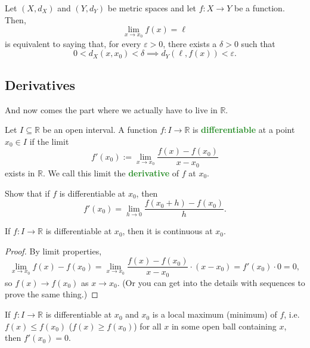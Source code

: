 \documentclass[10pt]{scrartcl}
\providecommand{\eps}{\varepsilon}
\providecommand{\RR}{\mathbb R}
\providecommand{\vocab}[1]{{\textbf{\textcolor{ForestGreen}{#1}}}}
\begin{document}
\begin{definition}\label{wk11:def:func-limit-epsdel}
	Let $(X, d_X)$ and $(Y, d_Y)$ be metric spaces
	and let $f\colon X\to Y$ be a function. Then,
	\[\lim_{x\to x_0} f(x) = \ell\]
	is equivalent to saying that, for every $\eps > 0$,
	there exists a $\delta > 0$ such that
	\[0 < d_X(x, x_0) < \delta \implies d_Y(\ell, f(x)) < \eps.\]
\end{definition}

\subsection{Derivatives}
And now comes the part where we actually have to live in $\RR$.
\begin{definition}[Differentiability]\label{wk11:def:diffable}
	Let $I\subseteq\RR$ be an open interval.
	A function $f\colon I\to\RR$ is \vocab{differentiable}
	at a point $x_0\in I$ if the limit
	\[f'(x_0) := \lim_{x\to x_0} \frac{f(x) - f(x_0)}{x - x_0}\]
	exists in $\RR$.
	We call this limit the \vocab{derivative} of $f$ at $x_0$.
\end{definition}

\begin{exercise}
	Show that if $f$ is differentiable at $x_0$, then
	\[f'(x_0) = \lim_{h\to 0} \frac{f(x_0 + h) - f(x_0)}{h}.\]
\end{exercise}

\begin{lemma}
	\label{wk11:lemma:diffable-impl-cont}
	If $f\colon I\to\RR$ is differentiable at $x_0$,
	then it is continuous at $x_0$.
\end{lemma}

\begin{proof}
	By limit properties,
	\[\lim_{x\to x_0} f(x) - f(x_0) =
	\lim_{x\to x_0} \frac{f(x) - f(x_0)}{x - x_0}\cdot (x - x_0)
	= f'(x_0)\cdot 0 = 0,\]
	so $f(x)\to f(x_0)$ as $x\to x_0$.
	(Or you can get into the details with sequences
	to prove the same thing.)
\end{proof}

\begin{theorem}
	\label{wk11:thm:zero-derivative-extrema}
	If $f\colon I\to\RR$ is differentiable at $x_0$ and
	$x_0$ is a local maximum (minimum) of $f$,
	i.e. $f(x) \le f(x_0)$ ($f(x)\ge f(x_0)$) for all $x$ in some
	open ball containing $x$, then $f'(x_0) = 0$.
\end{theorem}
\end{document}
